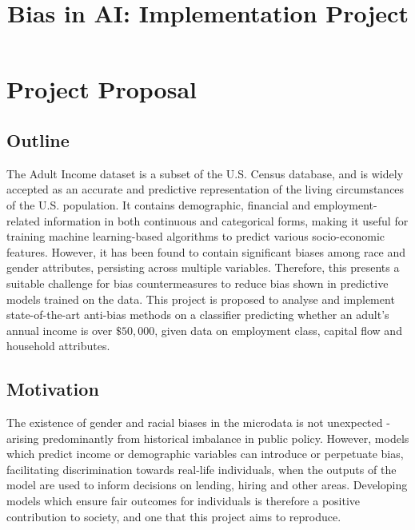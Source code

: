 \documentclass[conference]{IEEEtran}
\begin{document}
\title{Bias in AI: Implementation Project}
\author{
}
\maketitle

\section{Project Proposal}
\subsection{Outline}
The Adult Income dataset is a subset of the U.S. Census database, and is widely accepted as an accurate and predictive representation of the living circumstances of the U.S. population. It contains demographic, financial and employment-related information in both continuous and categorical forms, making it useful for training machine learning-based algorithms to predict various socio-economic features. However, it has been found to contain significant biases among race and gender attributes, persisting across multiple variables\cite{DBLP:journals/corr/abs-1908-09635}. Therefore, this presents a suitable challenge for bias countermeasures to reduce bias shown in predictive models trained on the data. This project is proposed to analyse and implement state-of-the-art anti-bias methods on a classifier predicting whether an adult's annual income is over $\$50,000$, given data on employment class, capital flow and household attributes.
\subsection{Motivation}
The existence of gender and racial biases in the microdata is not unexpected - arising predominantly from historical imbalance in public policy. However, models which predict income or demographic variables can introduce or perpetuate bias, facilitating discrimination towards real-life individuals, when the outputs of the model are used to inform decisions on lending, hiring and other areas. Developing models which ensure fair outcomes for individuals is therefore a positive contribution to society, and one that this project aims to reproduce.
\end{document}
